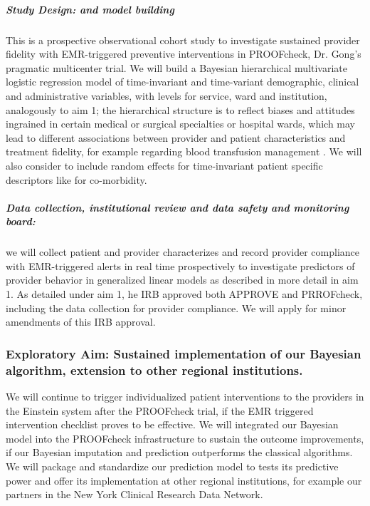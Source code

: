 \documentclass[11pt,notitlepage]{article}
\begin{document}
\subparagraph*{Study Design: and model building}
This is a prospective observational cohort study to investigate sustained provider fidelity with EMR-triggered preventive interventions in PROOFcheck, Dr. Gong's pragmatic multicenter trial. We will build a Bayesian hierarchical multivariate logistic regression model of time-invariant and time-variant demographic, clinical  and administrative variables, with levels for service, ward and institution, analogously to aim 1; the hierarchical structure is to reflect biases and attitudes ingrained in certain medical or surgical specialties or hospital wards, which may lead to different associations between provider and patient characteristics and treatment fidelity, for example regarding blood transfusion management \cite{Goodnough_23706801}. We will also consider to include random effects for time-invariant patient specific descriptors like for co-morbidity. 

\subparagraph*{Data collection, institutional review and data safety and monitoring board:} we will collect patient and provider characterizes and record provider compliance with EMR-triggered alerts in real time prospectively to investigate predictors of provider behavior in generalized linear models as described in more detail in aim 1. As detailed under aim 1, he IRB approved both APPROVE and PRROFcheck, including the data collection for provider compliance. We will apply for minor amendments of this IRB approval.


\subsubsection*{Exploratory Aim: Sustained implementation of our Bayesian algorithm, extension to other regional institutions.}
We will continue to trigger individualized patient interventions to the providers in the Einstein system after the PROOFcheck trial, if the EMR triggered intervention checklist proves to be effective. We will integrated our Bayesian model into the PROOFcheck infrastructure to sustain the outcome improvements, if our Bayesian imputation and prediction outperforms the classical algorithms. We will package and standardize our prediction model to tests its predictive power and offer its implementation at other regional institutions, for example our partners in the New York Clinical Research Data Network. 
\end{document}
